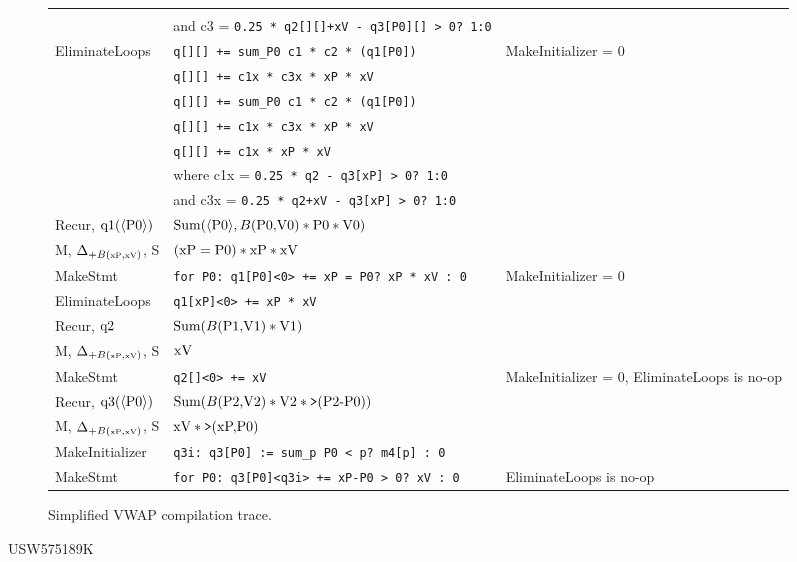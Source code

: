 \begin{figure*}
\begin{tabular}{l|l|l}
    &
\\
    & and c3 = \texttt{0.25 * q2[][]+xV - q3[P0][] > 0? 1:0}
    &
\\[1.5ex]
EliminateLoops
    & \texttt{q[][] += sum\_P0 c1 * c2 * (q1[P0])}
    & MakeInitializer = 0
\\
    & \texttt{q[][] += c1x * c3x * xP * xV}
    &
\\
    & \texttt{q[][] += sum\_P0 c1 * c2 * (q1[P0])}
    &
\\
    & \texttt{q[][] += c1x * c3x * xP * xV}
    &
\\
    & \texttt{q[][] += c1x * xP * xV}
    &
\\
    & where c1x = \texttt{0.25 * q2 - q3[xP] > 0? 1:0}
    &
\\
    & and c3x = \texttt{0.25 * q2+xV - q3[xP] > 0? 1:0}
    &
\\[1.5ex]
Recur, $\mbox{q1}({\langle\mbox{P0}\rangle})$
    & $\mbox{Sum}({\langle\mbox{P0}\rangle}, B(\mbox{P0,V0}) * \mbox{P0} * \mbox{V0})$
    &
\\
M,
$\Delta_{+B(\v{\tiny{xP}},\v{\tiny{xV}})}$,
S
   & $(\mbox{xP} = \mbox{P0}) * \mbox{xP} * \mbox{xV}$
   &
\\
MakeStmt
    & \texttt{for P0: q1[P0]<0> += xP = P0? xP * xV : 0}
    & MakeInitializer = 0
\\
EliminateLoops
    & \texttt{q1[xP]<0> += xP * xV}
    &
\\[1.5ex]
Recur, $\mbox{q2}$
    & $\mbox{Sum}(B(\mbox{P1,V1}) * \mbox{V1})$
    & 
\\
M,
$\Delta_{+B(\v{\tiny{xP}},\v{\tiny{xV}})}$,
S
   & $\mbox{xV}$
   &
\\
MakeStmt
    & \texttt{q2[]<0> += xV}
    & MakeInitializer = 0, EliminateLoops is no-op
\\[1.5ex]
Recur, $\mbox{q3}({\langle\mbox{P0}\rangle})$
    & $\mbox{Sum}(B(\mbox{P2,V2}) * \mbox{V2} * \mbox{{\tt >}}(\mbox{P2-P0}))$
    &    
\\
M,
$\Delta_{+B(\v{\tiny{xP}},\v{\tiny{xV}})}$,
S
   & $\mbox{xV} * \mbox{{\tt >}}(\mbox{xP,P0})$
   &
\\
MakeInitializer
    & \texttt{q3i: q3[P0] := sum\_p P0 < p? m4[p] : 0}
    &
\\
MakeStmt
    & \texttt{for P0: q3[P0]<q3i> += xP-P0 > 0? xV : 0 }
    & EliminateLoops is no-op
\end{tabular}
\caption{Simplified VWAP compilation trace.}
\label{fig:compilevwap}
\end{figure*}

USW575189K